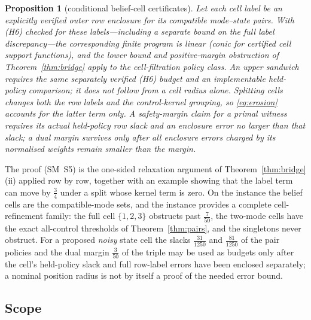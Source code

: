 \documentclass[11pt,a4paper]{article}
\theoremstyle{plain}
\newtheorem{proposition}[theorem]{Proposition}
\theoremstyle{definition}
\theoremstyle{remark}
\newcommand{\tfr}[2]{\tfrac{#1}{#2}}
\begin{document}
\begin{proposition}[conditional belief-cell certificates]\label{prop:beliefcells}
Let each cell label be an explicitly verified outer row enclosure for its compatible mode--state pairs. With \textup{(H6)} checked for these labels---including a separate bound on the full label discrepancy---the corresponding finite program is linear (conic for certified cell support functions), and the lower bound and positive-margin obstruction of Theorem~\ref{thm:bridge} apply to the cell-filtration policy class. An upper sandwich requires the same separately verified \textup{(H6)} budget and an implementable held-policy comparison; it does not follow from a cell radius alone. Splitting cells changes both the row labels and the control-kernel grouping, so \eqref{eq:erosion} accounts for the latter term only. A safety-margin claim for a primal witness requires its actual held-policy row slack and an enclosure error no larger than that slack; a dual margin survives only after all enclosure errors charged by its normalised weights remain smaller than the margin.
\end{proposition}

The proof (SM~S5) is the one-sided relaxation argument of Theorem~\ref{thm:bridge}(ii) applied row by row, together with an example showing that the label term can move by $\tfr34$ under a split whose kernel term is zero. On the instance the belief cells are the compatible-mode sets, and the instance provides a complete cell-refinement family: the full cell $\{1,2,3\}$ obstructs past $\tfr7{50}$, the two-mode cells have the exact all-control thresholds of Theorem~\ref{thm:pairs}, and the singletons never obstruct. For a proposed \emph{noisy} state cell the slacks $\tfr{31}{1250}$ and $\tfr{81}{1250}$ of the pair policies and the dual margin $\tfr3{50}$ of the triple may be used as budgets only after the cell's held-policy slack and full row-label errors have been enclosed separately; a nominal position radius is not by itself a proof of the needed error bound.

\subsection{Scope}\label{sec:scope}
\end{document}
